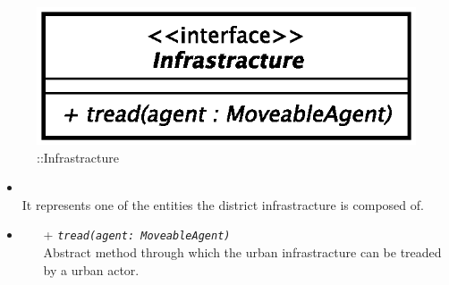 \begin{figure}[h]
\centering
\includegraphics[scale=0.6,keepaspectratio]{images/solution/app/backend/infrastracture.eps}
\caption{\pReactiveComponent::Infrastracture}
\label{fig:sd-app-infrastracture}
\end{figure}
\FloatBarrier
\begin{itemize}
  \item \textbf{\descr} \\
    It represents one of the entities the district infrastracture is composed
    of.
  \item \textbf{\ops}
  \begin{itemize} 
    \item[+] \texttt{\textit{tread(agent: MoveableAgent)}} \\
    Abstract method through which the urban infrastracture can be treaded by a
    urban actor.
  \end{itemize}
\end{itemize}
